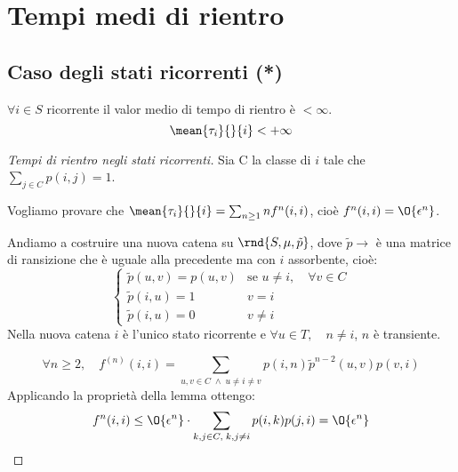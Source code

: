 \documentclass[\main/main.tex]{subfiles}
\begin{document}
\section{Tempi medi di rientro}
\subsection{Caso degli stati ricorrenti (*)}
\begin{theorem}
  \(\forall i \in S\) ricorrente il valor medio di tempo di rientro è \(< \infty\).
  \[
    \mean{\tau_i}{}{i} < + \infty
  \]
\end{theorem}
\begin{proof}[Tempi di rientro negli stati ricorrenti]
  Sia C la classe di \(i\) tale che \(\sum_{j \in C} p(i,j) = 1\).

  Vogliamo provare che \(\mean{\tau_i}{}{i} = \sum_{n \geq 1} n f^n(i,i)\), cioè \(f^n(i,i) = \O{\epsilon^n}\).

  Andiamo a costruire una nuova catena su \(\rnd{S, \mu, \tilde{p}}\), dove \(\tilde{p} \rightarrow\) è una matrice di ransizione che è uguale alla precedente ma con \(i\) assorbente, cioè:
  \[
    \begin{cases}
      \tilde{p}(u,v) = p(u,v) & \text{se } u\neq i, \quad \forall v \in C \\
      \tilde{p}(i,u) = 1      & v = i                                     \\
      \tilde{p}(i,u) = 0      & v \neq i
    \end{cases}
  \]
  Nella nuova catena \(i\) è l'unico stato ricorrente e \(\forall u \in T, \quad n\neq i\), \(n\) è transiente.

  \[
    \forall n \geq 2, \quad f^{(n)}(i,i) = \sum_{u,v \in C \; \land \; u \neq i \neq v} p(i,n) \tilde{p}^{n - 2} (u,v) p(v, i)
  \]
  Applicando la proprietà della lemma ottengo:
  \[
    f^n (i,i) \leq \O{\epsilon^n} \cdot \sum_{k,j \in C, \;k,j \neq i} p(i,k)p(j,i) = \O{\epsilon^n}
  \]
\end{proof}
\end{document}
